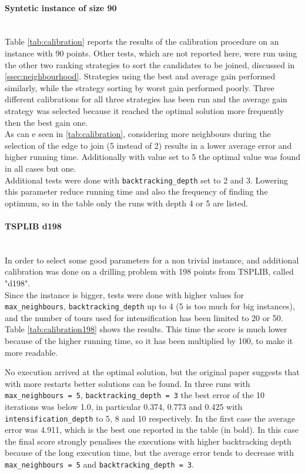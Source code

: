 \paragraph{Syntetic instance of size 90}\mbox{}\\
Table \ref{tab:calibration} reports the results of the calibration procedure on an instance with 90 points.
Other tests, which are not reported here, were run using the other two ranking strategies to sort the candidates to be joined, discussed in \cref{ssec:neighbourhood}. Strategies using the best and average gain performed similarly, while the strategy sorting by worst gain performed poorly. Three different calibrations for all three strategies has been run and the average gain strategy was selected because it reached the optimal solution more frequently then the best gain one.\\
As can e seen in \cref{tab:calibration}, considering more neighbours during the selection of the edge to join (5 instead of 2) results in a lower average error and higher running time. Additionally with value set to 5 the optimal value was found in all cases but one.\\
Additional tests were done with \texttt{backtracking\_depth} set to 2 and 3. Lowering this parameter reduce running time and also the frequency of finding the optimum, so in the table only the runs with depth 4 or 5 are listed.\\


\paragraph{TSPLIB d198}\mbox{}\\
In order to select some good parameters for a non trivial instance, and additional calibration was done on a drilling problem with 198 points from TSPLIB, called "d198".\\
Since the instance is bigger, tests were done with higher values for \texttt{max\_neighbours}, \texttt{back\-track\-ing\_depth} up to 4 (5 is too much for big instances), and the number of tours used for intensification has been limited to 20 or 50. Table \ref{tab:calibration198} shows the results. This time the score is much lower because of the higher running time, so it has been multiplied by 100, to make it more readable.


No execution arrived at the optimal solution, but the original paper suggests that with more restarts better solutions can be found. In three runs with \texttt{max\_neighbours = 5}, \texttt{back\-track\-ing\_depth = 3} the best error of the 10 iterations was below 1.0, in particular 0.374, 0.773 and 0.425 with \texttt{intensification\_depth} to 5, 8 and 10 respectively. In the first case the average error was 4.911, which is the best one reported in the table (in bold). In this case the final score strongly penalises the executions with higher backtracking depth because of the long execution time, but the average error tends to decrease with \texttt{max\_neighbours = 5} and \texttt{back\-track\-ing\_depth = 3}.
